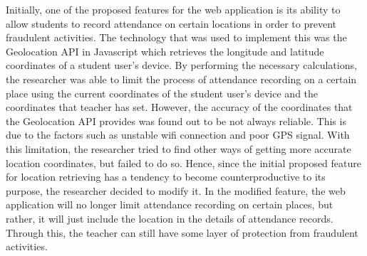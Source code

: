 \documentclass[journal]{./IEEE/IEEEtran}
\begin{document}
Initially, one of the proposed features for the web application is its ability to allow students to record attendance on certain locations in order to prevent fraudulent activities. The technology that was used to implement this was the Geolocation API in Javascript which retrieves the longitude and latitude coordinates of a student user’s device. By performing the necessary calculations, the researcher was able to limit the process of attendance recording on a certain place using the current coordinates of the  student user’s device and the coordinates that teacher has set. However, the accuracy of the coordinates that the Geolocation API provides was found out to be not always reliable. This is due to the factors such as unstable wifi connection and poor GPS signal. With this limitation, the researcher tried to find other ways of getting more accurate location coordinates, but failed to do so. Hence, since the initial proposed feature for location retrieving has a tendency to become counterproductive to its purpose, the researcher decided to modify it. In the modified feature, the web application will no longer limit attendance recording on certain places, but rather, it will just include the location in the details of attendance records. Through this, the teacher can still have some layer of protection from fraudulent activities. 
\end{document}
